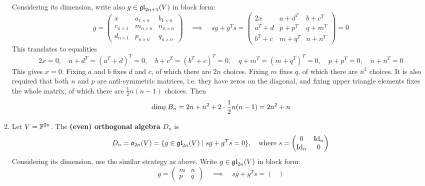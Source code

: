 \documentclass{article}
\begin{document}
\begin{example}
\begin{enumerate}
\[        \]
        Considering its dimension, write also $g \in \mathfrak{gl}_{2n+1}(V)$ in block form:
        \[
            g = 
            \begin{pmatrix}
                x              & a_{1 \times n} & b_{1 \times n} \\
                c_{n \times 1} & m_{n \times n} & n_{n \times n} \\
                d_{n \times 1} & p_{n \times n} & q_{n \times n}
            \end{pmatrix}
            \quad
            \implies
            \quad
            sg + g^T s =
            \begin{pmatrix}
                2x      & a + d^T & b + c^T \\
                a^T + d & p + p^T & q + m^T \\
                b^T + c & m + q^T & n + n^T
            \end{pmatrix}
            = 0
        \]
        This translates to equalities
        \[
            2x = 0, \quad
            a + d^T = (a^T + d)^T = 0, \quad
            b + c^T = (b^T + c)^T = 0, \quad
            q + m^T = (m + q^T)^T = 0, \quad 
            p + p^T = 0, \quad
            n + n^T = 0
        \]
        This gives $x = 0$. Fixing $a$ and $b$ fixes $d$ and $c$, of which there are $2n$ choices. Fixing $m$ fixes $q$, of which there are $n^2$ choices. It is also required that both $n$ and $p$ are anti-symmetric matrices, i.e. they have zeros on the diagonal, and fixing upper triangle elements fixes the whole matrix, of which there are $\frac{1}{2}n(n-1)$ choices. Then
        \[
            \dim_{\mathbb{F}} B_n = 2n + n^2 + 2 \cdot \frac{1}{2} n(n-1) = 2n^2 + n
        \]
        \item Let $V = \mathbb{F}^{2n}$. The \textbf{(even) orthogonal algebra} $D_n$ is
        \[
            D_n = \mathfrak{o}_{2n}(V) = \{ g \in \mathfrak{gl}_{2n}(V) \mid sg + g^T s = 0 \}, \quad \text{where } s = \begin{pmatrix} 0 & \mathrm{Id}_n \\ \mathrm{Id}_n & 0 \end{pmatrix}
        \]
        Considering its dimension, use the similar strategy as above. Write $g \in \mathfrak{gl}_{2n}(V)$ in block form:
        \[
            g = 
            \begin{pmatrix}
                m & n \\
                p & q
            \end{pmatrix}
            \quad \implies \quad
            sg + g^T s =
            \begin{pmatrix}

\end{pmatrix}\]
\end{enumerate}
\end{example}
\end{document}
